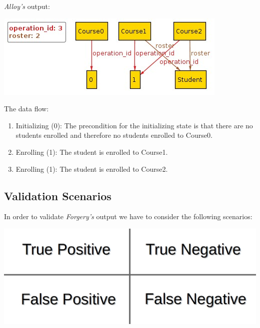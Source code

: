 \documentclass[oneside]{book}
\begin{document}
\textit{Alloy's} output:\\
\begin{center}
\includegraphics[scale=0.7]{output_traces}
\end{center}

The data flow:
\begin{enumerate}
	\item Initializing (0): The precondition for the initializing state is that there are no students enrolled and therefore no students enrolled to Course0.
	\item Enrolling (1): The student is enrolled to Course1.
	\item Enrolling (1): The student is enrolled to Course2.
\end{enumerate}

\subsection{Validation Scenarios}

In order to validate \textit{Forgery's} output we have to consider the following scenarios:
\begin{center}
\includegraphics[scale=0.25]{scenarios}
\end{center}

\end{document}
